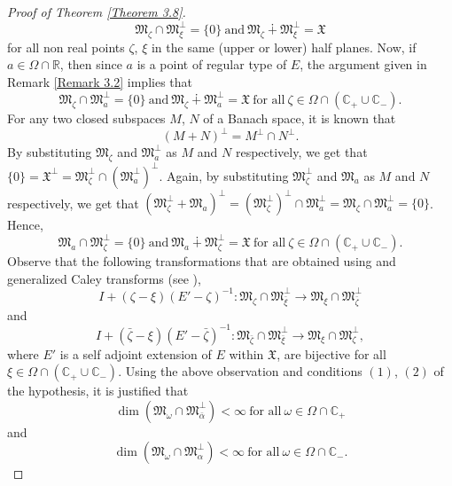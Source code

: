 \documentclass [12pt,reqno]{amsart}
\numberwithin{equation}{subsection}
\numberwithin{equation}{section}
\begin{document}
\begin{proof}[Proof of Theorem \ref{Theorem 3.8}]
\begin{equation}
\mathfrak{M}_{\zeta} \cap \mathfrak{M}_{\xi}^{\perp}=\{ 0 \} ~\mbox{and}~\mathfrak{M}_{\zeta} \dotplus \mathfrak{M}_{\xi}^{\perp}= \mathfrak{X} 
\end{equation} for all non real points $\zeta$, $\xi$ in the same (upper or lower) half planes. Now, if $a \in \Omega \cap \mathbb{R}$, then since $a$ is a point of regular type of $E$, the argument given in Remark \ref{Remark 3.2} implies that \begin{equation} \label{Equation 4.4}\mathfrak{M}_{\zeta} \cap \mathfrak{M}_{a}^{\perp}=\{ 0 \} ~\mbox{and}~\mathfrak{M}_{\zeta} \dotplus \mathfrak{M}_{a}^{\perp}=\mathfrak{X} ~\mbox{for all}~\zeta \in \Omega \cap(\mathbb{C}_+ \cup \mathbb{C}_-). \end{equation}
For any two closed subspaces $M$, $N$ of a Banach space, it is known that $$(M+N)^{\perp}= M^{\perp} \cap N^{\perp}.$$
By substituting $\mathfrak{M}_{\zeta}$ and $\mathfrak{M}_{a}^{\perp}$ as $M$ and $N$ respectively, we get that $\{ 0 \}= \mathfrak{X}^{\perp}= \mathfrak{M}_{\zeta}^{\perp} \cap (\mathfrak{M}_{a}^{\perp})^{\perp}$. Again, by substituting $\mathfrak{M}_{\zeta}^{\perp}$ and $\mathfrak{M}_{a}$ as $M$ and $N$ respectively, we get that $(\mathfrak{M}_{\zeta}^{\perp} +\mathfrak{M}_{a})^{\perp}= (\mathfrak{M}_{\zeta}^{\perp})^{\perp} \cap \mathfrak{M}_{a}^{\perp}=\mathfrak{M}_{\zeta} \cap \mathfrak{M}_{a}^{\perp}=\{ 0 \}$. Hence,
\begin{equation}\label{Equation 4.5}\mathfrak{M}_{a} \cap \mathfrak{M}_{\zeta}^{\perp}=\{ 0 \} ~\mbox{and}~\mathfrak{M}_{a} \dotplus \mathfrak{M}_{\zeta}^{\perp}=\mathfrak{X} ~\mbox{for all}~\zeta \in \Omega \cap(\mathbb{C}_+ \cup \mathbb{C}_-). \end{equation}
Observe that the following transformations that are obtained using \cite[Appendix $1$, Lemma $1.2$]{kreinlect} and generalized Caley transforms (see \cite[Chapter $1$, Section $2$]{kreinlect}), 
$$I+(\zeta-\xi)(E'-\zeta)^{-1}: \mathfrak{M}_{\zeta} \cap \mathfrak{M}_{\bar{\xi}}^{\perp} \rightarrow \mathfrak{M}_{\xi} \cap \mathfrak{M}_{\bar{\zeta}}^{\perp}$$ and 
$$I+(\bar{\zeta}-\xi)(E'-\bar{\zeta})^{-1}: \mathfrak{M}_{\bar{\zeta}} \cap \mathfrak{M}_{\bar{\xi}}^{\perp} \rightarrow \mathfrak{M}_{\xi} \cap \mathfrak{M}_{\zeta}^{\perp},$$ 
where $E'$ is a self adjoint extension of $E$ within $\mathfrak{X}$, are bijective for all $\xi \in \Omega \cap (\mathbb{C}_+ \cup \mathbb{C_-})$. Using the above observation and conditions $(1)$, $(2)$ of the hypothesis, it is justified that \begin{equation} \label{Equation 4.6}\dim(\mathfrak{M}_{\omega} \cap \mathfrak{M}_{\bar{\alpha}}^{\perp})< \infty ~\mbox{for all}~\omega \in \Omega \cap \mathbb{C}_+ \end{equation} and \begin{equation} \label{a.0.6}\dim(\mathfrak{M}_{\omega} \cap \mathfrak{M}_{\alpha}^{\perp})< \infty ~\mbox{for all}~\omega \in \Omega \cap \mathbb{C}_-.\end{equation}

\end{proof}
\end{document}
